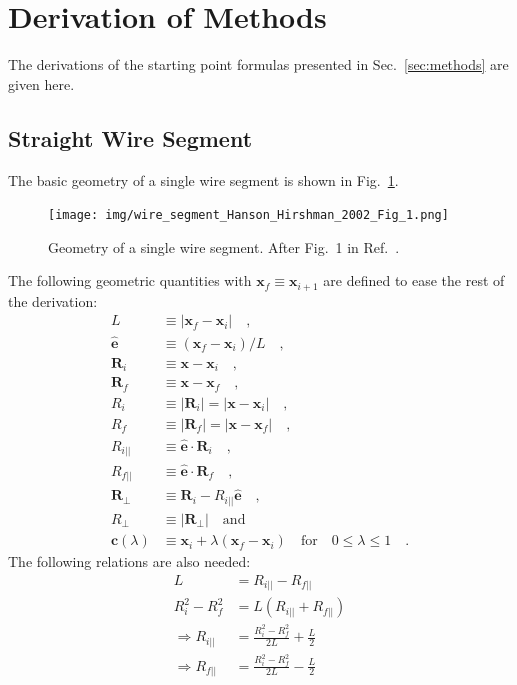 \section{Derivation of Methods}
\label{apx:derivation_of_methods}
The derivations of the starting point formulas presented in Sec.~\ref{sec:methods} are given here.

\subsection{Straight Wire Segment}
The basic geometry of a single wire segment is shown in Fig.~\ref{fig:wire_segment_Hanson_Hirshman_2002_Fig_1}.
\begin{figure}[htbp]
 \centering
 \texttt{[image: img/wire\_segment\_Hanson\_Hirshman\_2002\_Fig\_1.png]}
 \caption{Geometry of a single wire segment. After Fig.~1 in Ref.~\cite{hanson_hirshman_2002}.}
 \label{fig:wire_segment_Hanson_Hirshman_2002_Fig_1}
\end{figure}
The following geometric quantities with $\mathbf{x}_f \equiv \mathbf{x}_{i+1}$ are defined to ease the rest of the derivation:
\begin{align}
 L                   & \equiv | \mathbf{x}_f - \mathbf{x}_i | \quad , \\
 \hat{\mathbf{e}}    & \equiv \left(\mathbf{x}_f - \mathbf{x}_i\right) / L \quad , \\
 \mathbf{R}_i        & \equiv \mathbf{x} - \mathbf{x}_i \quad , \\
 \mathbf{R}_f        & \equiv \mathbf{x} - \mathbf{x}_f \quad , \\
 R_i                 & \equiv | \mathbf{R}_i | = | \mathbf{x} - \mathbf{x}_i | \quad , \\
 R_f                 & \equiv | \mathbf{R}_f | = | \mathbf{x} - \mathbf{x}_f | \quad , \\
 R_{i ||}            & \equiv \hat{\mathbf{e}} \cdot \mathbf{R}_i \quad , \\
 R_{f ||}            & \equiv \hat{\mathbf{e}} \cdot \mathbf{R}_f \quad , \\
 \mathbf{R}_\perp    & \equiv \mathbf{R}_i - R_{i ||} \hat{\mathbf{e}} \quad , \\
 R_\perp             & \equiv | \mathbf{R}_\perp | \quad \mathrm{and} \\
 \mathbf{c}(\lambda) & \equiv \mathbf{x}_i + \lambda \left(\mathbf{x}_f - \mathbf{x}_i\right) \quad \mathrm{for} \quad 0 \leq \lambda \leq 1 \quad .
\end{align}
The following relations are also needed:
\begin{align}
       L             & = R_{i ||} - R_{f ||} \\
       R_i^2 - R_f^2 & = L \left( R_{i ||} + R_{f ||} \right) \\
\Rightarrow R_{i ||} & = \frac{R_i^2 - R_f^2}{2 L} + \frac{L}{2} \\
\Rightarrow R_{f ||} & = \frac{R_i^2 - R_f^2}{2 L} - \frac{L}{2}
\end{align}

